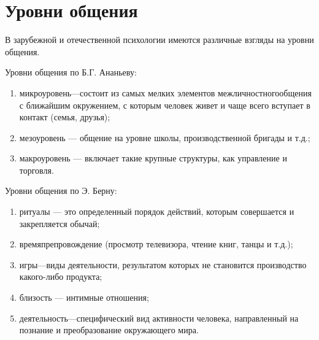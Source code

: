 \section{Уровни общения}
В зарубежной и отечественной психологии имеются различные взгляды на уровни общения. \cite{28}

Уровни общения по Б.Г. Ананьеву:
\begin{enumerate}
	\item микроуровень—состоит из самых мелких элементов межличностногообщения с ближайшим окружением, с которым человек живет и чаще всего вступает в контакт (семья, друзья);
	\item мезоуровень — общение на уровне школы, производственной бригады и т.д.;
	\item макроуровень — включает такие крупные структуры, как управление и торговля. 
\end{enumerate}

Уровни общения по Э. Берну:
\begin{enumerate}
	\item ритуалы — это определенный порядок действий, которым совершается и закрепляется обычай;
	\item времяпрепровождение (просмотр телевизора, чтение книг, танцы и т.д.);
	\item игры—виды деятельности, результатом которых не становится производство какого-либо продукта;
	\item близость — интимные отношения;
	\item деятельность—специфический вид активности человека, направленный на познание и преобразование окружающего мира. 
\end{enumerate}

